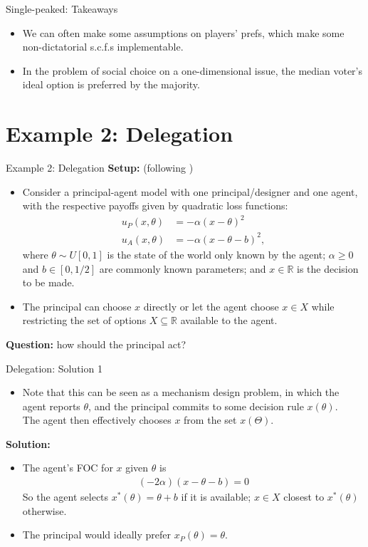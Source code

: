 \documentclass[english,10pt
,aspectratio=169
]{beamer}
\begin{document}
\begin{frame}{Single-peaked: Takeaways}
	\begin{itemize}
		\item We can often make some assumptions on players' prefs, which make some non-dictatorial s.c.f.s implementable.
		\item In the problem of social choice on a one-dimensional issue, the median voter's ideal option is preferred by the majority.
	\end{itemize}
\end{frame}



\section{Example 2: Delegation}

\begin{frame}{Example 2: Delegation}
	\textbf{Setup:} (following \cite{holmstrom_theory_1980})
	\begin{itemize}
		\item Consider a principal-agent model with one principal/designer and one agent, with the respective payoffs given by quadratic loss functions:
		\begin{align*}
			u_P(x,\theta) &= - \alpha (x-\theta)^2
			\\
			u_A(x,\theta) &= - \alpha (x-\theta-b)^2,
		\end{align*}
		where $\theta \sim U[0,1]$ is the state of the world only known by the agent; $\alpha \geq 0$ and $b \in [0,1/2]$ are commonly known parameters; and $x \in \mathbb{R}$ is the decision to be made.
		\item The principal can choose $x$ directly or let the agent choose $x \in X$ while restricting the set of options $X \subseteq \mathbb{R}$ available to the agent.
	\end{itemize}
	\textbf{Question:} how should the principal act?
\end{frame}


\begin{frame}{Delegation: Solution 1}
	\begin{itemize}
		\item Note that this can be seen as a mechanism design problem, in which the agent reports $\theta$, and the principal commits to some decision rule $x(\theta)$. \\
		The agent then effectively chooses $x$ from the set $x(\Theta)$.
	\end{itemize}
	\textbf{Solution:}
	\begin{itemize}
		\item The agent's FOC for $x$ given $\theta$ is 
		\begin{align*}
			(-2\alpha) (x-\theta-b) = 0
		\end{align*}
		So the agent selects $x^*(\theta) = \theta+b$ if it is available; $x \in X$ closest to $x^*(\theta)$ otherwise.
		\item The principal would ideally prefer $x_P(\theta) = \theta$.
	\end{itemize}
\end{frame}
\end{document}
